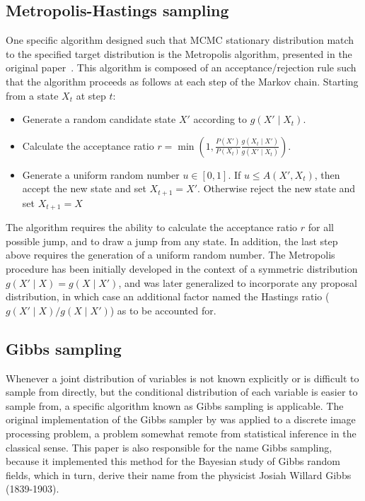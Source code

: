 \subsection{Metropolis-Hastings sampling}

One specific algorithm designed such that \acrshort{MCMC} stationary distribution match to the specified target distribution is the Metropolis algorithm, presented in the original paper~\citep{Metropolis1953}.
This algorithm is composed of an acceptance/rejection rule such that the algorithm proceeds as follows at each step of the Markov chain.
Starting from a state $X_t$ at step $t$:
\begin{itemize}
    \item Generate a random candidate state $X'$ according to $g(X'\mid X_t)$.
    \item Calculate the acceptance ratio $\displaystyle r=\min \left(1,{\frac {P(X')}{P(X_{t})}}{\frac {g(X_{t}\mid X')}{g(X'\mid X_{t})}}\right)$.
    \item Generate a uniform random number $u\in [0,1]$.
    If $u\leq A(X',X_{t})$, then accept the new state and set $X_{t+1}=X'$.
    Otherwise reject the new state and set $X_{t+1}=X$
\end{itemize}

The algorithm requires the ability to calculate the acceptance ratio $r$ for all possible jump, and to draw a jump from any state.
In addition, the last step above requires the generation of a uniform random number.
The Metropolis procedure has been initially developed in the context of a symmetric distribution $g(X'\mid X) = g(X \mid X')$, and was later generalized to incorporate any proposal distribution, in which case an additional factor named the Hastings ratio ($g(X'\mid X) / g(X \mid X')$) as to be accounted for.

\subsection{Gibbs sampling}

Whenever a joint distribution of variables is not known explicitly or is difficult to sample from directly, but the conditional distribution of each variable is easier to sample from, a specific algorithm known as Gibbs sampling is applicable.
The original implementation of the Gibbs sampler by \citet{Geman1984} was applied to a discrete image processing problem, a problem somewhat remote from statistical inference in the classical sense.
This paper is also responsible for the name Gibbs sampling, because it implemented this method for the Bayesian study of Gibbs random fields, which in turn, derive their name from the physicist Josiah Willard Gibbs (1839-1903).

